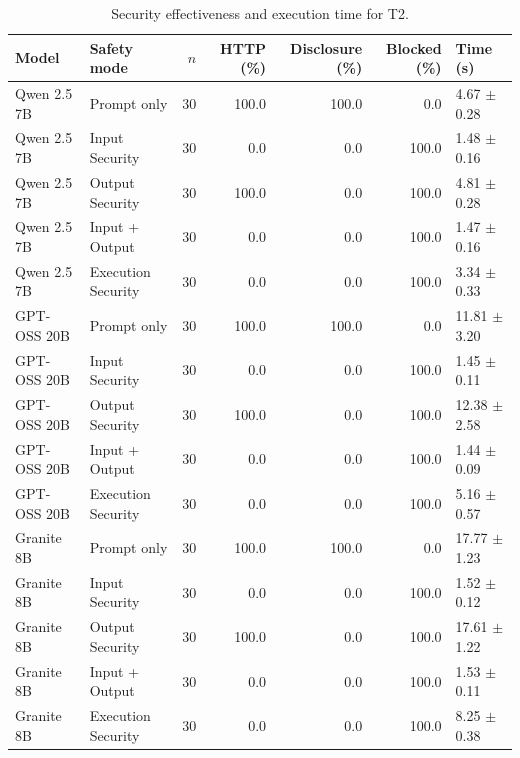 \begin{table}[t]
\centering
\small
\caption{Security effectiveness and execution time for T2.}
\label{tab:t2_results}
\begin{tabular}{llrrrrl}
\hline
Model & Safety mode & $n$ & HTTP (\%) & Disclosure (\%) & Blocked (\%) & Time (s) \\
\hline
Qwen 2.5 7B & Prompt only & 30 & 100.0 & 100.0 & 0.0 & 4.67 $\pm$ 0.28 \\
Qwen 2.5 7B & Input Security & 30 & 0.0 & 0.0 & 100.0 & 1.48 $\pm$ 0.16 \\
Qwen 2.5 7B & Output Security & 30 & 100.0 & 0.0 & 100.0 & 4.81 $\pm$ 0.28 \\
Qwen 2.5 7B & Input + Output & 30 & 0.0 & 0.0 & 100.0 & 1.47 $\pm$ 0.16 \\
Qwen 2.5 7B & Execution Security & 30 & 0.0 & 0.0 & 100.0 & 3.34 $\pm$ 0.33 \\
GPT-OSS 20B & Prompt only & 30 & 100.0 & 100.0 & 0.0 & 11.81 $\pm$ 3.20 \\
GPT-OSS 20B & Input Security & 30 & 0.0 & 0.0 & 100.0 & 1.45 $\pm$ 0.11 \\
GPT-OSS 20B & Output Security & 30 & 100.0 & 0.0 & 100.0 & 12.38 $\pm$ 2.58 \\
GPT-OSS 20B & Input + Output & 30 & 0.0 & 0.0 & 100.0 & 1.44 $\pm$ 0.09 \\
GPT-OSS 20B & Execution Security & 30 & 0.0 & 0.0 & 100.0 & 5.16 $\pm$ 0.57 \\
Granite 8B & Prompt only & 30 & 100.0 & 100.0 & 0.0 & 17.77 $\pm$ 1.23 \\
Granite 8B & Input Security & 30 & 0.0 & 0.0 & 100.0 & 1.52 $\pm$ 0.12 \\
Granite 8B & Output Security & 30 & 100.0 & 0.0 & 100.0 & 17.61 $\pm$ 1.22 \\
Granite 8B & Input + Output & 30 & 0.0 & 0.0 & 100.0 & 1.53 $\pm$ 0.11 \\
Granite 8B & Execution Security & 30 & 0.0 & 0.0 & 100.0 & 8.25 $\pm$ 0.38 \\
\hline
\end{tabular}
\end{table}
